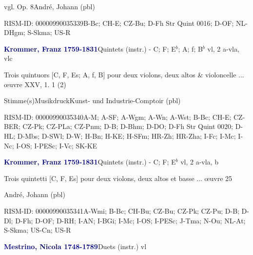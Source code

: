 \documentclass[twocolumn]{book}
\begin{document}
\par vgl. Op. 8\newline André, Johann  (pbl)
\par RISM-ID: 00000990035339\newline B-Bc; CH-E; CZ-Bu; D-Fh  Str Quint 0016; D-OF; NL-DHgm; S-Skma; US-R
\par \vspace{7pt} \textcolor{darkblue}{\textbf{Krommer, Franz  1759-1831}}\hfillplus{\textbf{[300]}}\newline Quintets (instr.) - C; F; E$^b$; A; f; B$^b$ vl, 2 a-vla, vlc
\par \begin{itshape}Trois quintuors [C, F, Es; A, f, B] pour deux violons, deux altos \& violoncelle ... œuvre XXV, 1. 1 (2)\end{itshape} 
\par \textcolor{darkblue}{}  Stimme(s)\newline Musikdruck\newline Kunst- und Industrie-Comptoir  (pbl)
\par RISM-ID: 00000990035340\newline A-M; A-SF; A-Wgm; A-Wn; A-Wst; B-Bc; CH-E; CZ-BER; CZ-Pk; CZ-PLa; CZ-Pnm; D-B; D-Bhm; D-DO; D-Fh  Str Quint 0020; D-HL; D-Mbs; D-SWl; D-W; H-Bn; H-KE; H-SFm; HR-Zh; HR-Zha; I-Fc; I-Mc; I-Nc; I-OS; I-PESc; I-Vc; SK-KE
\par \vspace{7pt} \textcolor{darkblue}{\textbf{Krommer, Franz  1759-1831}}\hfillplus{\textbf{[301]}}\newline Quintets (instr.) - C; F; E$^b$ vl, 2 a-vla, b
\par \begin{itshape}Trois quintetti [C, F, Es] pour deux violons, deux altos et basse ... œuvre 25\end{itshape} \newline André, Johann  (pbl)
\par RISM-ID: 00000990035341\newline A-Wmi; B-Bc; CH-Bu; CZ-Bu; CZ-Pk; CZ-Pu; D-B; D-Dl; D-Fh; D-OF; D-RH; I-AN; I-BGi; I-Mc; I-OS; I-PESc; J-Tma; N-Ou; NL-At; S-Skma; US-Cn; US-R
\par \vspace{7pt} \textcolor{darkblue}{\textbf{Mestrino, Nicola  1748-1789}}\hfillplus{\textbf{[302]}}\newline Duets (instr.) vl
\end{document}
